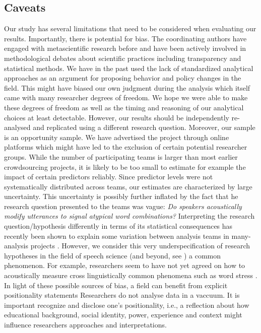 \documentclass[Review,times,sageh]{sagej}
\begin{document}
\hypertarget{caveats}{%
\subsection{Caveats}\label{caveats}}

Our study has several limitations that need to be considered when evaluating our results.
Importantly, there is potential for bias.
The coordinating authors have engaged with metascientific research before and have been actively involved in methodological debates about scientific practices including transparency and statistical methods.
We have in the past used the lack of standardized analytical approaches as an argument for proposing behavior and policy changes in the field.
This might have biased our own judgment during the analysis which itself came with many researcher degrees of freedom.
We hope we were able to make these degrees of freedom as well as the timing and reasoning of our analytical choices at least detectable.
However, our results should be independently re-analysed and replicated using a different research question.
Moreover, our sample is an opportunity sample.
We have advertised the project through online platforms which might have led to the exclusion of certain potential researcher groups.
While the number of participating teams is larger than most earlier crowdsourcing projects, it is likely to be too small to estimate for example the impact of certain predictors reliably.
Since predictor levels were not systematically distributed across teams, our estimates are characterized by large uncertainty.
This uncertainty is possibly further inflated by the fact that he research question presented to the teams was vague: \emph{Do speakers acoustically modify utterances to signal atypical word combinations?}
Interpreting the research question/hypothesis differently in terms of its statistical consequences has recently been shown to explain some variation between analysis teams in many-analysis projects \citep{auspurg2021has}.
However, we consider this very underspecification of research hypotheses in the field of speech science (and beyond, see \citet{scheel2022most}) a common phenomenon.
For example, researchers seem to have not yet agreed on how to acoustically measure cross linguistically common phenomena such as word stress \citep[e.g.][]{gordon2017acoustic}.
In light of these possible sources of bias, a field can benefit from explicit positionality statements \citep[e.g.,][]{fox2021open}
Researchers do not analyse data in a vaccuum.
It is important recognize and disclose one's positionality, i.e., a reflection about how educational background, social identity, power, experience and context might influence researchers approaches and interpretations.
\end{document}
